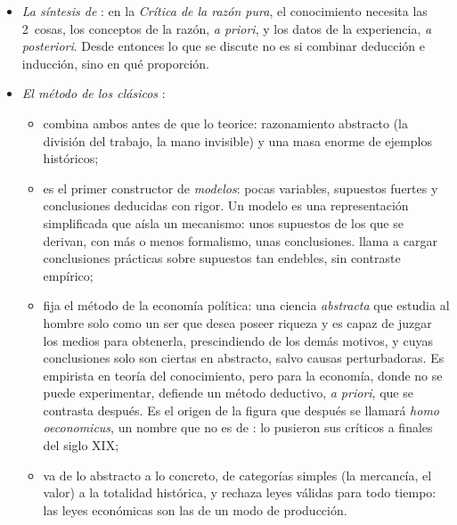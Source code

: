 \documentclass[11pt]{article}
\begin{document}
\begin{itemize}
\begin{itemize}
\begin{itemize}
    \end{itemize}
  \item \emph{En economía} hay pocos ejemplos puros: la escuela de Harvard de organización industrial, que parte de regularidades observadas entre la estructura de los mercados y sus resultados ; con matices, la preferencia revelada de \textcite{Samuelson1938Note}, que construye la teoría desde lo que se elige y no desde las preferencias ; y los experimentos aleatorizados (\ref{sec:experimentos}).
  \end{itemize}
\item \emph{La síntesis de }: en la \emph{Crítica de la razón pura}\nocite{Kant1781Kritik}, el conocimiento necesita las 2~cosas, los conceptos de la razón, \emph{a priori}, y los datos de la experiencia, \emph{a posteriori}. Desde entonces lo que se discute no es si combinar deducción e inducción, sino en qué proporción.
\item \emph{El método de los clásicos} :
  \begin{itemize}
  \item \textcite{Smith1776Wealth} combina ambos antes de que  lo teorice: razonamiento abstracto (la división del trabajo, la mano invisible) y una masa enorme de ejemplos históricos;
  \item \textcite{Ricardo1817Principles} es el primer constructor de \emph{modelos}: pocas variables, supuestos fuertes y conclusiones deducidas con rigor. Un modelo es una representación simplificada que aísla un mecanismo: unos supuestos de los que se derivan, con más o menos formalismo, unas conclusiones. \textcite[pág.~473]{Schumpeter1954History} llama  a cargar conclusiones prácticas sobre supuestos tan endebles, sin contraste empírico;
  \item {} fija el método de la economía política: una ciencia \emph{abstracta} que estudia al hombre solo como un ser que desea poseer riqueza y es capaz de juzgar los medios para obtenerla, prescindiendo de los demás motivos, y cuyas conclusiones solo son ciertas en abstracto, salvo causas perturbadoras\nocite{Mill1836Definition}. Es empirista en teoría del conocimiento\nocite{Mill1843Logic}, pero para la economía, donde no se puede experimentar, defiende un método deductivo, \emph{a priori}, que se contrasta después. Es el origen de la figura que después se llamará \emph{homo oeconomicus}, un nombre que no es de : lo pusieron sus críticos a finales del siglo XIX\nocite{Persky1995Ethology};
  \item {} va de lo abstracto a lo concreto, de categorías simples (la mercancía, el valor) a la totalidad histórica, y rechaza leyes válidas para todo tiempo: las leyes económicas son las de un modo de producción\nocite{Marx1857Grundrisse}.
  \end{itemize}
\end{itemize}
\end{document}
